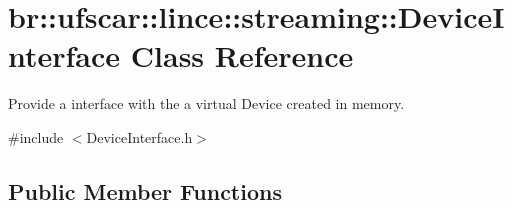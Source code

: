 \hypertarget{classbr_1_1ufscar_1_1lince_1_1streaming_1_1DeviceInterface}{
\section{br::ufscar::lince::streaming::DeviceInterface Class Reference}
\label{classbr_1_1ufscar_1_1lince_1_1streaming_1_1DeviceInterface}
}


Provide a interface with the a virtual Device created in memory.  




{\ttfamily \#include $<$DeviceInterface.h$>$}

\subsection*{Public Member Functions}
